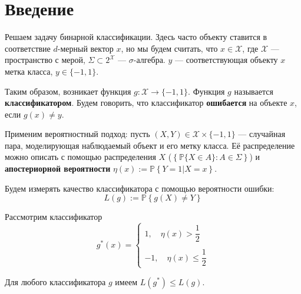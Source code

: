 \documentclass[12pt]{article}
\newtheorem{theorem}{\hskip\parindent Теорема}%
\begin{document}
\section{Введение}
Решаем задачу бинарной классификации. Здесь часто объекту ставится в соответствие $d$-мерный вектор $x$, но мы будем считать, что $x\in\mathcal{X}$, где $\mathcal{X}$ --- пространство с мерой, $\Sigma\subset 2^{\mathcal{X}}$ --- $\sigma$-алгебра. $y$ --- соответствующая объекту $x$ метка класса, $y\in\{-1,1\}$.

Таким образом, возникает функция $g: \mathcal{X}\to\{-1,1\}$. Функция $g$ называется \textbf{классификатором}. Будем говорить, что классификатор \textbf{ошибается} на объекте $x$, если $g(x)\ne y$.

Применим вероятностный подход: пусть $(X,Y)\in \mathcal{X}\times\{-1,1\}$ --- случайная пара, моделирующая наблюдаемый объект и его метку класса. Её распределение можно описать с помощью распределения $X$ ($\left\{\mathbb{P}\{X\in A\}: A\in\Sigma\right\}$) и \textbf{апостериорной вероятности} $\eta(x):=\mathbb{P}\left\{Y=1| X=x\right\}$.

Будем измерять качество классификатора с помощью вероятности ошибки:
\begin{equation*}
	L(g):=\mathbb{P}\left\{g(X)\ne Y\right\}
\end{equation*}

Рассмотрим классификатор
\begin{equation*}
	g^*(x)=\begin{cases}
		1, \quad \eta(x)>\dfrac{1}{2}\\ \\
		-1, \quad \eta(x)\leqslant\dfrac{1}{2}
	\end{cases}
\end{equation*}
\begin{theorem}
	Для любого классификатора $g$ имеем $L(g^*)\leqslant L(g)$.
\end{theorem}
\end{document}
